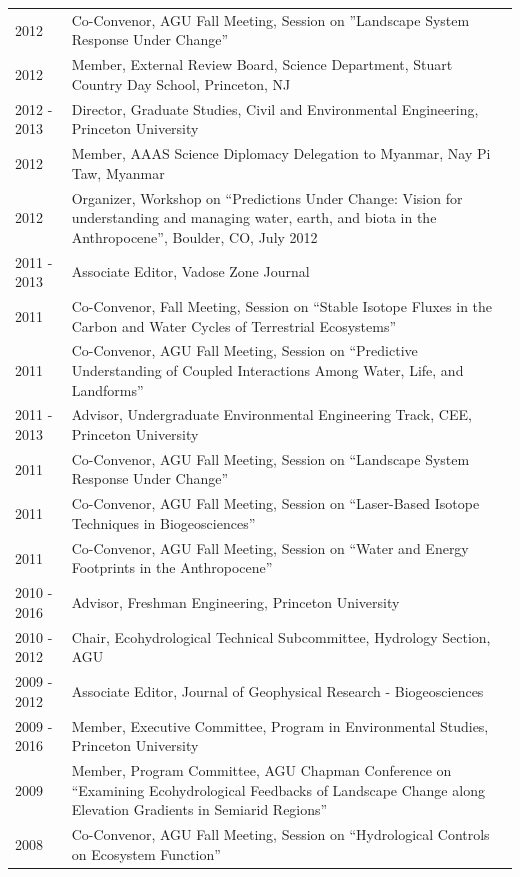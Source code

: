 \begin{longtable}{l p{5.5in}}
2012 & Co-Convenor, AGU Fall Meeting, Session on ''Landscape System Response Under Change'' \\
2012 & Member, External Review Board, Science Department, Stuart Country Day School, Princeton, NJ \\
2012 - 2013 & Director, Graduate Studies, Civil and Environmental Engineering, Princeton University \\
2012 & Member, AAAS Science Diplomacy Delegation to Myanmar, Nay Pi Taw, Myanmar \\
2012 & Organizer, Workshop on ``Predictions Under Change: Vision for understanding and managing water, earth, and biota in the Anthropocene'', Boulder, CO, July 2012 \\
2011 - 2013 & Associate Editor, Vadose Zone Journal \\
2011 & Co-Convenor, Fall Meeting, Session on ``Stable Isotope Fluxes in the Carbon and Water Cycles of Terrestrial Ecosystems'' \\
2011 & Co-Convenor, AGU Fall Meeting, Session on ``Predictive Understanding of Coupled Interactions Among Water, Life, and Landforms'' \\
2011 - 2013 & Advisor, Undergraduate Environmental Engineering Track, CEE, Princeton University \\
2011 & Co-Convenor, AGU Fall Meeting, Session on ``Landscape System Response Under Change'' \\
2011 & Co-Convenor, AGU Fall Meeting, Session on ``Laser-Based Isotope Techniques in Biogeosciences'' \\
2011 & Co-Convenor, AGU Fall Meeting, Session on ``Water and Energy Footprints in the Anthropocene'' \\
2010 - 2016 & Advisor, Freshman Engineering, Princeton University \\
2010 - 2012 & Chair, Ecohydrological Technical Subcommittee, Hydrology Section, AGU \\
2009 - 2012 & Associate Editor, Journal of Geophysical Research - Biogeosciences \\
2009 - 2016 & Member, Executive Committee, Program in Environmental Studies, Princeton University \\
2009 & Member, Program Committee, AGU Chapman Conference on ``Examining Ecohydrological Feedbacks of Landscape Change along Elevation Gradients in Semiarid Regions'' \\
2008 & Co-Convenor, AGU Fall Meeting, Session on ``Hydrological Controls on Ecosystem Function'' \\

\end{longtable}
